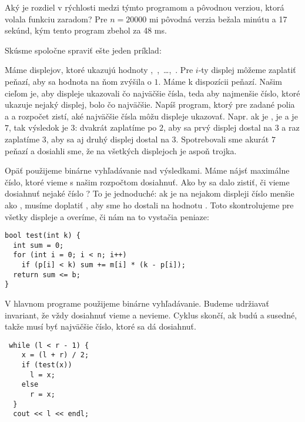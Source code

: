 Aký je rozdiel v rýchlosti medzi týmto programom a pôvodnou verziou, ktorá
volala funkciu  zaradom? Pre $n=20000$ mi pôvodná verzia bežala minútu
a 17 sekúnd, kým tento program zbehol za 48 ms. 


Skúsme spoločne spraviť ešte jeden príklad:

\begin{uloha}
  Máme  displejov, ktoré ukazujú hodnoty 
  \hbox{, , \ldots, .}
  Pre $i$-ty displej môžeme zaplatiť   peňazí, aby sa
  hodnota na ňom zvýšila o $1$.
  Máme k dispozícii  peňazí. Našim cieľom je, aby  displeje
  ukazovali čo najväčšie čísla, teda aby najmenšie číslo, ktoré ukazuje nejaký
  displej, bolo čo najväčšie. Napíš program, ktorý pre zadané polia  a
   a rozpočet  zistí, aké najväčšie čísla môžu displeje ukazovať.
  Napr. ak  je \hbox{\vb{[1 2 3]}},  je \hbox{\vb{[2 3 1]}} a  je $7$, tak
  výsledok je $3$: dvakrát zaplatíme po $2$, aby sa prvý displej dostal na $3$
  a raz zaplatíme $3$, aby sa aj druhý displej dostal na $3$. Spotrebovali sme akurát $7$
  peňazí a dosiahli sme, že na všetkých displejoch je aspoň trojka.
\end{uloha}

Opäť použijeme binárne vyhľadávanie nad výsledkami. Máme nájsť maximálne číslo, ktoré
vieme s našim rozpočtom  dosiahnuť. Ako by sa dalo zistiť, či vieme dosiahnuť
nejaké číslo ? To je jednoduché: ak je na nejakom displeji číslo  menšie
ako , musíme doplatiť , aby sme ho dostali na hodnotu .
Toto skontrolujeme pre všetky displeje a overíme, či nám na to vystačia peniaze:

\begin{lstlisting}
bool test(int k) {
  int sum = 0;
  for (int i = 0; i < n; i++)
    if (p[i] < k) sum += m[i] * (k - p[i]);
  return sum <= b;
}
\end{lstlisting}

V hlavnom programe použijeme binárne vyhľadávanie. Budeme udržiavať invariant, že
 vždy dosiahnuť vieme a  nevieme. Cyklus skončí, ak budú 
a  susedné, takže  musí byť najväčšie číslo, ktoré sa dá dosiahnuť.

\begin{lstlisting}
 while (l < r - 1) { 
    x = (l + r) / 2;
    if (test(x))
      l = x;
    else
      r = x;
  } 
  cout << l << endl;
\end{lstlisting}


